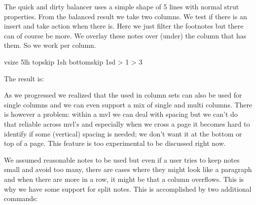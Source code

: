 \typebuffer[whatever]

The quick and dirty balancer uses a simple shape of 5 lines with normal strut
properties. From the balanced result we take two columns. We test if there is an
insert and take action when there is. Here we just filter the footnotes but there
can of course be more. We overlay these notes over (under) the column that has
them. So we work per column.

\startbuffer[balance]
\begingroup
    \setbox\scratchboxone{}
        vsize      5lh
        topskip    1sh
        bottomskip 1sd
    \relax
    \setbox\scratchboxtwo\vbalance\scratchboxone
     \bgroup
         {
          \ifnum\currentloopiterator > 1
            \emwidth
          \fi
          \setbox\scratchboxthree\vbalancedbox\scratchboxtwo \relax
          \ifnum\boxinserts\scratchboxthree > 3
            \setbox\scratchboxfour\vbalancedinsert
                \scratchboxthree\scratchcounter
            \wd\scratchboxfour 0pt
            \box\scratchboxfour
          \fi
          \box\scratchboxthree
        }\unskip
    \egroup
\endgroup
\stopbuffer

\typebuffer[balance]

The result is:

\start
    \getbuffer[populate] %
    \startlinecorrection
        \getbuffer[whatever]
        \getbuffer[balance]
    \stoplinecorrection
\stop

As we progressed we realized that the  used in column sets can
also be used for single columns and we can even support a mix of single and multi
columns. There is however a problem: within a mvl we can deal with spacing but we
can't do that reliable across mvl's and especially when we cross a page it
becomes hard to identify if some (vertical) spacing is needed; we don't want it
at the bottom or top of a page. This feature is too experimental to be discussed
right now.

We assumed reasonable notes to be used but even if a user tries to keep notes
small and avoid too many, there are cases where they might look like a paragraph
and when there are more in a row, it might be that a column overflows. This is
why we have some support for split notes. This is accomplished by two additional
commands:

\starttyping
\setbox\scratchboxone\vbalance\scratchboxone\relax
\vbalanceddeinsert\scratchboxone\relax
\stoptyping

